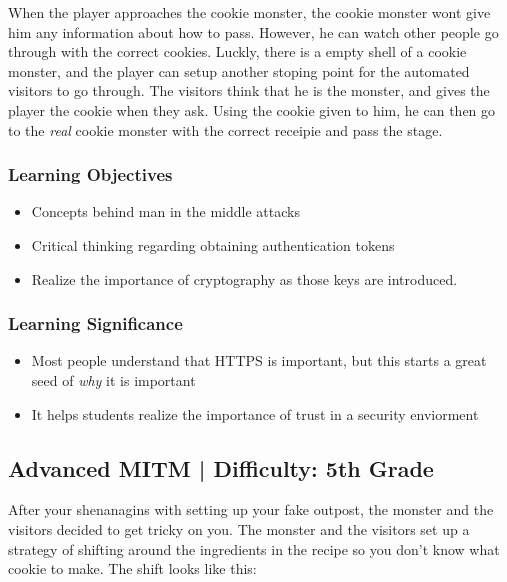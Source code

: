 \documentclass{article}
\begin{document}
When the player approaches the cookie monster, the cookie monster wont
give him any information about how to pass. However, he can watch
other people go through with the correct cookies. Luckly, there is a
empty shell of a cookie monster, and the player can setup another
stoping point for the automated visitors to go through. The visitors
think that he is the monster, and gives the player the cookie when
they ask. Using the cookie given to him, he can then go to the
\textit{real} cookie monster with the correct receipie and pass the
stage.

\subsubsection{Learning Objectives}

\begin{itemize}
  \item Concepts behind man in the middle attacks
  \item Critical thinking regarding obtaining authentication tokens
  \item Realize the importance of cryptography as those keys are
    introduced.
\end{itemize}

\subsubsection{Learning Significance}

\begin{itemize}
  \item Most people understand that HTTPS is important, but this
    starts a great seed of \textit{why} it is important
  \item It helps students realize the importance of trust in a
    security enviorment
\end{itemize}

\subsection{Advanced MITM | Difficulty: 5th Grade}

After your shenanagins with setting up your fake outpost, the monster
and the visitors decided to get tricky on you. The monster and the
visitors set up a strategy of shifting around the ingredients in the
recipe so you don't know what cookie to make. The shift looks like
this:
\end{document}
